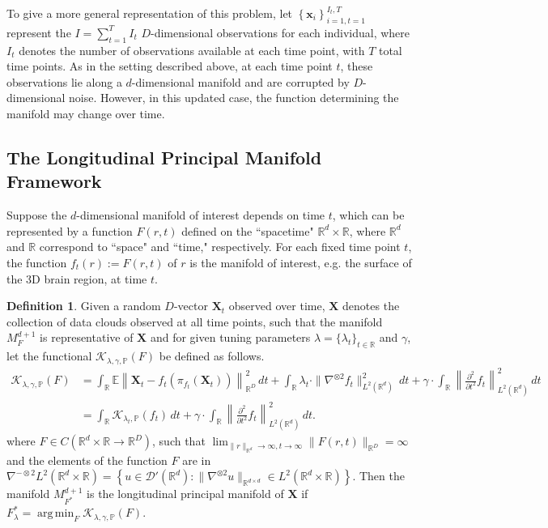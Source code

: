 \documentclass[11pt,reqno]{article}
\DeclareMathOperator*{\argmin}{arg\,min}
\theoremstyle{definition}
\newtheorem{definition}{Definition}
\begin{document}
To give a more general representation of this problem, let $\left\{\bm{x}_i\right\}_{i=1, t=1}^{I_t, T}$ represent the $I = \sum_{t=1}^{T}I_t$ $D$-dimensional observations for each individual, where $I_t$ denotes the number of observations available at each time point, with $T$ total time points. As in the setting described above, at each time point $t$, these observations lie along a $d$-dimensional manifold and are corrupted by $D$-dimensional noise. However, in this updated case, the function determining the manifold may change over time.

\subsection{The Longitudinal Principal Manifold Framework}

Suppose the $d$-dimensional manifold of interest depends on time $t$, which can be represented by a function $F(r,t)$ defined on the ``spacetime" $\mathbb{R}^d\times\mathbb{R}$, where $\mathbb{R}^d$ and $\mathbb{R}$ correspond to ``space" and ``time," respectively. For each fixed time point $t$, the function $f_t(r):=F(r,t)$ of $r$ is the manifold of interest, e.g. the surface of the 3D brain region, at time $t$.
\begin{definition}
  \label{def:lpme} Given a random $D$-vector $\boldsymbol{X}_t$ observed over time, $\boldsymbol{X}$ denotes the collection of data clouds observed at all time points, such that the manifold $M_F^{d+1}$ is representative of $\boldsymbol{X}$ and for given tuning parameters $\lambda=\{\lambda_t\}_{t\in\mathbb{R}}$ and $\gamma$, let the functional $\mathcal{K}_{\lambda, \gamma, \mathbb{P}}(F)$ be defined as follows.
\begin{align}\label{eq:newKappa}
  \mathcal{K}_{\lambda, \gamma, \mathbb{P}}(F) &= \int_\mathbb{R} \mathbb{E}\left\|\boldsymbol{X}_t - f_t\left(\pi_{f_t}(\boldsymbol{X}_t)\right)\right\|_{\mathbb{R}^{D}}^2 \, dt + \int_\mathbb{R} \lambda_t \cdot\|\nabla^{\otimes 2}f_t\|_{L^2(\mathbb{R}^{d})}^2 \, dt + \gamma\cdot \int_{\mathbb{R}}\left\|\frac{\partial^2}{\partial t^2}f_t\right\|_{L^2(\mathbb{R}^d)}^2 \, dt \\
  &= \int_{\mathbb{R}}\mathcal{K}_{\lambda_t, \mathbb{P}}(f_t) \, dt + \gamma \cdot \int_{\mathbb{R}}\left\|\frac{\partial^2}{\partial t^2}f_t\right\|_{L^2(\mathbb{R}^d)}^2 \, dt. \nonumber
\end{align}
where $F \in C(\mathbb{R}^{d}\times\mathbb{R} \to \mathbb{R}^{D})$, such that $\lim_{\|r\|_{\mathbb{R}^{d}} \to \infty, t \to \infty}\|F(r,t)\|_{\mathbb{R}^{D}} = \infty$ and the elements of the function $F$ are in $\nabla^{-\otimes 2}L^2(\mathbb{R}^{d}\times\mathbb{R}) = \left\{u \in \mathcal{D}'(\mathbb{R}^{d}): \|\nabla^{\otimes 2} u\|_{\mathbb{R}^{d \times d}} \in L^2(\mathbb{R}^{d}\times\mathbb{R})\right\}$. Then the manifold $M_{F^{*}}^{d+1}$ is the longitudinal principal manifold of $\boldsymbol{X}$ if $F_{\lambda}^{*} = \argmin_{F}\mathcal{K}_{\lambda, \gamma, \mathbb{P}}(F)$.
\end{definition}
\end{document}
